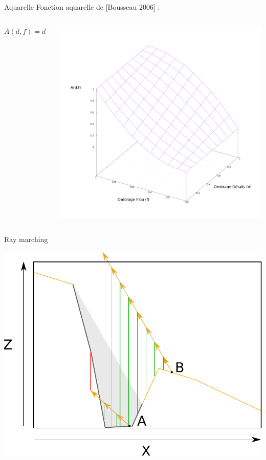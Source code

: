 \documentclass{beamer}
\begin{document}
\begin{frame}[noframenumbering]{Aquarelle}
Fonction aquarelle de [Bousseau 2006] :
\begin{columns}
\begin{column}{0.4\textwidth}

  \begin{equation}
		A(d,f) = d-(d-d^2)(1-2f)
	\end{equation}		
\end{column}
\begin{column}{0.6\textwidth}  %
    \begin{center}
     \includegraphics[width=1.0\linewidth]{Schema/watercolor_curve.png}
     \end{center}
\end{column}
\end{columns}

\end{frame}
\begin{frame}[noframenumbering]{Ray marching}
\begin{center} 
 
   	\includegraphics[width=0.7\linewidth]{Schema/raymarching.pdf}
\end{center}
\end{frame}
\end{document}
